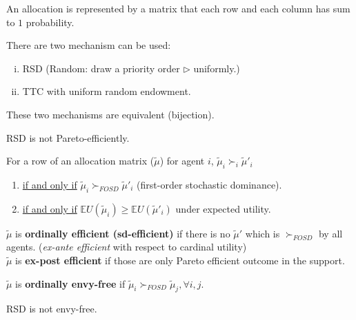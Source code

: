 \documentclass[11pt]{elegantbook}
\begin{document}
An allocation is represented by a matrix that each row and each column has sum to $1$ probability.

There are two mechanism can be used:
\begin{enumerate}[(i).]
    \item RSD (Random: draw a priority order $\rhd$ uniformly.)
    \item TTC with uniform random endowment.
\end{enumerate}
\begin{theorem}
    These two mechanisms are equivalent (bijection).
\end{theorem}


RSD is not Pareto-efficiently.

\begin{proposition}
    For a row of an allocation matrix ($\tilde{\mu}$) for agent $i$, $\tilde{\mu}_i\succ_i\tilde{\mu}'_i$
    \begin{enumerate}[$\circ$]
        \item \underline{if and only if} $\tilde{\mu}_i\succ_{FOSD}\tilde{\mu}'_i$ (first-order stochastic dominance).
        \item \underline{if and only if} $\mathbb{E}U(\tilde{\mu}_i)\geq\mathbb{E}U(\tilde{\mu}'_i)$ under expected utility.
    \end{enumerate}
\end{proposition}

\begin{definition}
    \normalfont
    $\tilde{\mu}$ is \textbf{ordinally efficient (sd-efficient)} if there is no $\tilde{\mu}'$ which is $\succ_{FOSD}$ by all agents. (\textit{ex-ante efficient} with respect to cardinal utility)\\
    $\tilde{\mu}$ is \textbf{ex-post efficient} if those are only Pareto efficient outcome in the support.
\end{definition}

\begin{definition}
    \normalfont
    $\tilde{\mu}$ is \textbf{ordinally envy-free} if $\tilde{\mu}_i\succ_{FOSD}\tilde{\mu}_j, \forall i,j$.
\end{definition}
RSD is not envy-free.
\end{document}
